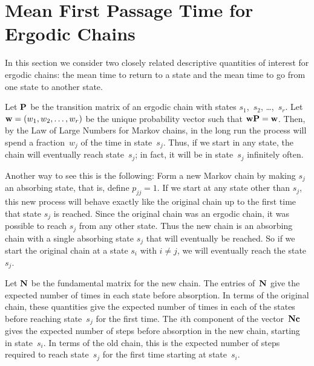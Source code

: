 \section[Mean First Passage Time]{Mean First Passage Time for Ergodic
Chains}\label{sec 11.5}
In this section we consider two closely related descriptive quantities of
interest for ergodic chains: the mean time to return to a state and the mean
time to go from one state to another state.
\par
Let ${\mbox{\bf P}\/}$ be the transition matrix of an ergodic chain with states
$s_1$,~$s_2$, \ldots,~$s_r$.  Let ${\mbox{\bf w}\/} = (w_1,w_2,\ldots,w_r)$ be the
unique
probability vector such that ${\mbox{\bf w}\/} {\mbox{\bf P}\/} = {\mbox{\bf w}\/}$.  Then, by the Law
of Large
Numbers for Markov chains, in the long run the process will spend a
fraction~$w_j$ of the time in state~$s_j$.  Thus, if we start in any state, 
the chain will eventually reach state~$s_j$; in fact, it will be in state~$s_j$
infinitely often.
\par
Another way to see this is the following:  Form a new Markov chain by making
$s_j$ an
absorbing state, that is, define $p_{jj} = 1$.  If we start at any state other
than $s_j$,
this new process will behave exactly like the original chain up to the first
time that state
$s_j$ is reached.  Since the original chain was an ergodic chain, it was
possible to reach
$s_j$ from any other state.  Thus the new chain is an absorbing chain with a
single absorbing
state $s_j$ that will eventually be reached.  So if we start the original chain
at a state
$s_i$ with $i \ne j$, we will eventually reach the state $s_j$.
\par
Let ${\mbox{\bf N}\/}$ be the fundamental matrix for the new chain.  The entries
of~${\mbox{\bf N}\/}$
give the expected number of times in each state before absorption.  In terms of
the original chain, these quantities give the expected number of times in each
of the states before reaching state~$s_j$ for the first time.  The $i$th
component of the vector~${\mbox{\bf N}\/} {\mbox{\bf c}\/}$ gives the expected number of steps
before
absorption in the new chain, starting in state~$s_i$.  In terms of the old
chain, this is the expected number of steps required to reach state~$s_j$ for
the first time starting at state~$s_i$.

